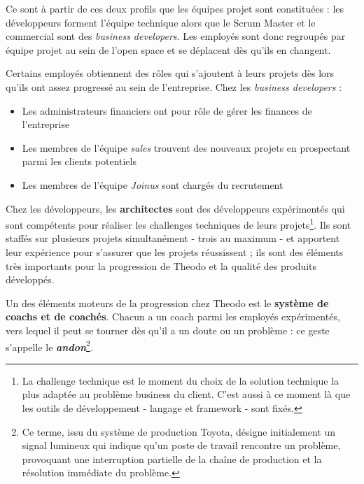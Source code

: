 Ce sont à partir de ces deux profils que les équipes projet sont constituées : les développeurs forment l'équipe technique alors que le Scrum Master et le commercial sont des \textit{\foreignlanguage{english}{business developers}}. Les employés sont donc regroupés par équipe projet au sein de l'open space et se déplacent dès qu'ils en changent.

Certains employés obtiennent des rôles qui s'ajoutent à leurs projets dès lors qu'ils ont assez progressé au sein de l'entreprise. Chez les \textit{\foreignlanguage{english}{business developers}} :
\begin{itemize}
\item Les administrateurs financiers ont pour rôle de gérer les finances de l'entreprise
\item Les membres de l'équipe \textit{\foreignlanguage{english}{sales}} trouvent des nouveaux projets en prospectant parmi les clients potentiels
\item Les membres de l'équipe \textit{\foreignlanguage{english}{Joinus}} sont chargés du recrutement
\end{itemize}

Chez les développeurs, les \textbf{architectes} sont des développeurs expérimentés qui sont compétents pour réaliser les challenges techniques de leurs projets\footnote{La challenge technique est le moment du choix de la solution technique la plus adaptée au problème \foreignlanguage{english}{business} du client. C'est aussi à ce moment là que les outils de développement - langage et \foreignlanguage{english}{framework} - sont fixés.}. Ils sont staffés sur plusieurs projets simultanément - trois au maximum - et apportent leur expérience pour s'assurer que les projets réussissent ; ils sont des éléments très importants pour la progression de Theodo et la qualité des produits développés.

Un des éléments moteurs de la progression chez Theodo est le \textbf{système de coachs et de coachés}. Chacun a un coach parmi les employés expérimentés, vers lequel il peut se tourner dès qu'il a un doute ou un problème : ce geste s'appelle le \textbf{\textit{andon}}\footnote{Ce terme, issu du système de production Toyota, désigne initialement un signal lumineux qui indique qu'un poste de travail rencontre un problème, provoquant une interruption partielle de la chaîne de production et la résolution immédiate du problème.}.
